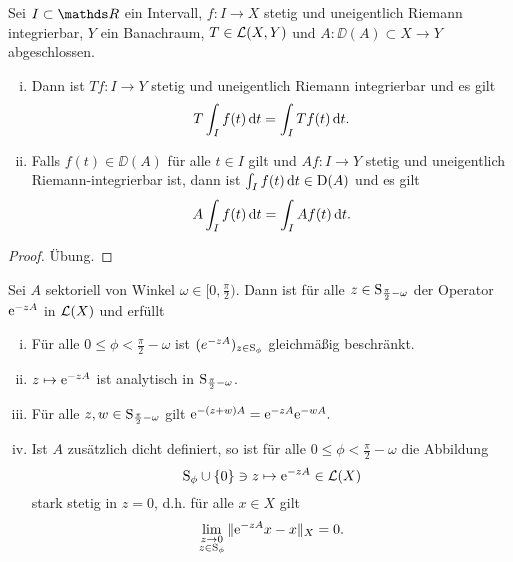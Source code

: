 \begin{prop}
  \label{prop:opInIntegral}
  Sei $I \subset \R$ ein Intervall, $f \colon I \to X$ stetig und uneigentlich Riemann integrierbar, $Y$ ein Banachraum, $T \in \mathcal{L}(X,Y)$ und $A \colon \DD(A) \subset X \to Y$ abgeschlossen.
  \begin{enumerate}[(i)]
    \item Dann ist $Tf \colon I \to Y$ stetig und uneigentlich Riemann integrierbar und es gilt
      $$
      T \int_I f(t) \, {\operatorname{d}\!{t}} = \int_I Tf(t)\, {\operatorname{d}\!{t}}.
      $$
    \item Falls $f(t) \in \DD(A)$ für alle $t \in I$ gilt und $Af \colon I \to Y$ stetig und uneigentlich Riemann-integrierbar ist, dann ist $\int_I f(t) \, {\operatorname{d}\!{t}} \in \mathrm{D}(A)$ und es gilt 
      $$
      A \int_I f(t) \, {\operatorname{d}\!{t}} = \int_I A f(t) \, {\operatorname{d}\!{t}}.
      $$
  \end{enumerate}
\end{prop}

\begin{proof}
  Übung.
\end{proof}

\begin{thm}
  Sei $A$ sektoriell von Winkel $\omega \in [0,\frac{\pi}{2})$.
    Dann ist für alle $z \in \mathrm{S}_{\frac{\pi}{2} - \omega}$ der Operator $\mathrm{e}^{-zA}$ in $\mathcal{L}(X)$ und erfüllt
    \begin{enumerate}[(i)]
      \item Für alle $0 \leq \phi < \frac{\pi}{2} - \omega$ ist $(e^{-zA})_{z \in \mathrm{S}_\phi}$ gleichmäßig beschränkt.
      \item $z \mapsto \mathrm{e}^{-zA}$ ist analytisch in $\mathrm{S}_{\frac{\pi}{2} - \omega}$.
      \item Für alle $z,w \in \mathrm{S}_{\frac{\pi}{2} - \omega}$ gilt 
        $
        \mathrm{e}^{-(z + w)A} = \mathrm{e}^{-zA}\mathrm{e}^{-w A}.
        $
      \item Ist $A$ zusätzlich dicht definiert, so ist für alle $0 \leq \phi < \frac{\pi}{2} - \omega$ die Abbildung
        $$
        \mathrm{S}_\phi \cup \{0\} \ni z \mapsto \mathrm{e}^{-z A} \in \mathcal{L}(X)
        $$
        stark stetig in $z = 0$, d.h. für alle $x \in X$ gilt
        $$
        \lim_{\substack{z \to 0 \\ z \in \mathrm{S}_\phi}} \|\mathrm{e}^{-zA} x - x\|_X = 0.
        $$
    \end{enumerate}
\end{thm}

